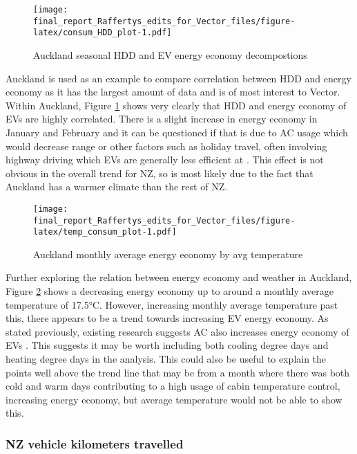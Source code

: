 \documentclass[
]{article}
\begin{document}
\begin{figure}
\centering
\texttt{[image: final\_report\_Raffertys\_edits\_for\_Vector\_files/figure-latex/consum\_HDD\_plot-1.pdf]}
\caption{Auckland seasonal HDD and EV energy economy
decompostions\label{fig:consum_HDD_plot}}
\end{figure}

Auckland is used as an example to compare correlation between HDD and
energy economy as it has the largest amount of data and is of most
interest to Vector. Within Auckland, Figure \ref{fig:consum_HDD_plot}
shows very clearly that HDD and energy economy of EVs are highly
correlated. There is a slight increase in energy economy in January and
February and it can be questioned if that is due to AC usage which would
decrease range \cite{ev_range} or other factors such as holiday travel,
often involving highway driving which EVs are generally less efficient
at \cite{ev_highway}. This effect is not obvious in the overall trend
for NZ, so is most likely due to the fact that Auckland has a warmer
climate than the rest of NZ.

\begin{figure}
\centering
\texttt{[image: final\_report\_Raffertys\_edits\_for\_Vector\_files/figure-latex/temp\_consum\_plot-1.pdf]}
\caption{Auckland monthly average energy economy by avg
temperature\label{fig:temp_consum_plot}}
\end{figure}

Further exploring the relation between energy economy and weather in
Auckland, Figure \ref{fig:temp_consum_plot} shows a decreasing energy
economy up to around a monthly average temperature of 17.5°C. However,
increasing monthly average temperature past this, there appears to be a
trend towards increasing EV energy economy. As stated previously,
existing research suggests AC also increases energy economy of EVs
\cite{ev_range}. This suggests it may be worth including both cooling
degree days and heating degree days in the analysis. This could also be
useful to explain the points well above the trend line that may be from
a month where there was both cold and warm days contributing to a high
usage of cabin temperature control, increasing energy economy, but
average temperature would not be able to show this.

\hypertarget{nz-vehicle-kilometers-travelled}{%
\subsubsection{NZ vehicle kilometers
travelled}\label{nz-vehicle-kilometers-travelled}}
\end{document}

